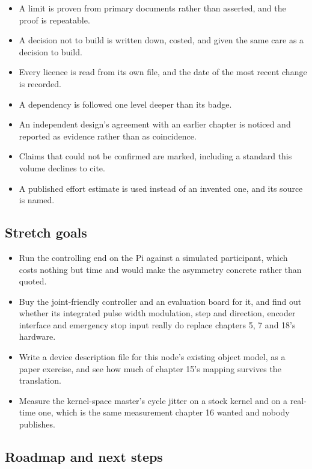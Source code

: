 \begin{itemize}
\item A limit is proven from primary documents rather than asserted, and the
proof is repeatable.
\item A decision not to build is written down, costed, and given the same care
as a decision to build.
\item Every licence is read from its own file, and the date of the most recent
change is recorded.
\item A dependency is followed one level deeper than its badge.
\item An independent design's agreement with an earlier chapter is noticed and
reported as evidence rather than as coincidence.
\item Claims that could not be confirmed are marked, including a standard this
volume declines to cite.
\item A published effort estimate is used instead of an invented one, and its
source is named.
\end{itemize}

\subsection*{Stretch goals}

\begin{itemize}
\item Run the controlling end on the Pi against a simulated participant, which
costs nothing but time and would make the asymmetry concrete rather than
quoted.
\item Buy the joint-friendly controller and an evaluation board for it, and find
out whether its integrated pulse width modulation, step and direction, encoder
interface and emergency stop input really do replace chapters 5, 7 and 18's
hardware.
\item Write a device description file for this node's existing object model, as
a paper exercise, and see how much of chapter 15's mapping survives the
translation.
\item Measure the kernel-space master's cycle jitter on a stock kernel and on a
real-time one, which is the same measurement chapter 16 wanted and nobody
publishes.
\end{itemize}

\subsection*{Roadmap and next steps}

